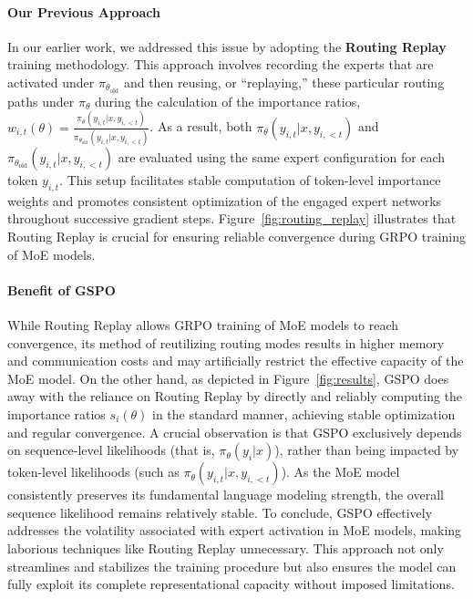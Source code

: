 \paragraph{Our Previous Approach} In our earlier work, we addressed this issue by adopting the \textbf{Routing Replay} training methodology. This approach involves recording the experts that are activated under $\pi_{\theta_\text{old}}$ and then reusing, or ``replaying,'' these particular routing paths under $\pi_{\theta}$ during the calculation of the importance ratios, $w_{i,t}(\theta) = \frac{ \pi_{\theta} (y_{i,t} | x, y_{i,<t}) }{ \pi_{\theta_\text{old}} (y_{i,t} | x,y_{i,<t})}$. As a result, both $\pi_{\theta} (y_{i,t} | x, y_{i,<t})$ and $\pi_{\theta_\text{old}} (y_{i,t} | x, y_{i,<t})$ are evaluated using the same expert configuration for each token $y_{i,t}$. This setup facilitates stable computation of token-level importance weights and promotes consistent optimization of the engaged expert networks throughout successive gradient steps. Figure~\ref{fig:routing_replay} illustrates that Routing Replay is crucial for ensuring reliable convergence during GRPO training of MoE models.

\paragraph{Benefit of GSPO} While Routing Replay allows GRPO training of MoE models to reach convergence, its method of reutilizing routing modes results in higher memory and communication costs and may artificially restrict the effective capacity of the MoE model. On the other hand, as depicted in Figure~\ref{fig:results}, GSPO does away with the reliance on Routing Replay by directly and reliably computing the importance ratios $s_i(\theta)$ in the standard manner, achieving stable optimization and regular convergence. A crucial observation is that GSPO exclusively depends on sequence-level likelihoods (that is, $\pi_{\theta} (y_i | x)$), rather than being impacted by token-level likelihoods (such as $\pi_{\theta} (y_{i,t} | x, y_{i,<t})$). As the MoE model consistently preserves its fundamental language modeling strength, the overall sequence likelihood remains relatively stable. To conclude, GSPO effectively addresses the volatility associated with expert activation in MoE models, making laborious techniques like Routing Replay unnecessary. This approach not only streamlines and stabilizes the training procedure but also ensures the model can fully exploit its complete representational capacity without imposed limitations.


